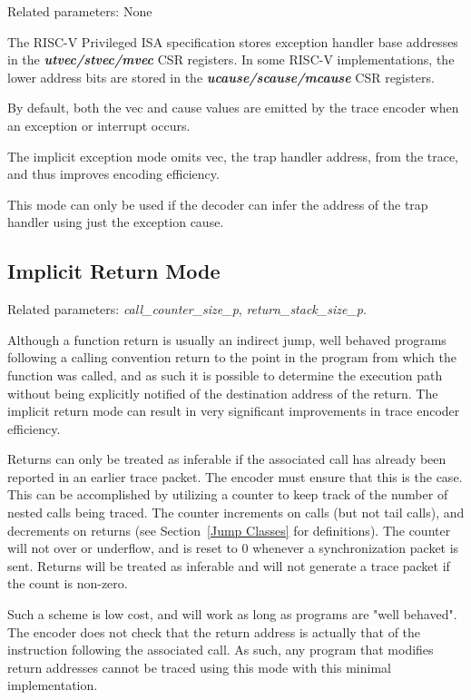 Related parameters: None

The RISC-V Privileged ISA specification stores exception handler base
addresses in the \textbf{\textit{utvec/stvec/mvec}} CSR registers.
In some RISC-V implementations, the lower address bits are stored in
the \textbf{\textit{ucause/scause/mcause}} CSR registers.

By default, both the vec and cause values are emitted by the trace encoder
when an exception or interrupt occurs.

The implicit exception mode omits vec, the trap handler address, from
the trace, and thus improves encoding efficiency.

This mode can only be used if the decoder can infer the address of the trap
handler using just the exception cause.

\subsection{Implicit Return Mode} \label{sec:implicit-return}

Related parameters: \textit{call\_counter\_size\_p}, \textit{return\_stack\_size\_p}.

Although a function return is usually an indirect jump, well behaved programs following a 
calling convention return to the point in the program from which the function was called, 
and as such it is possible to determine the execution path without being explicitly notified 
of the destination address of the return.  The implicit return mode can result in very
significant improvements in trace encoder efficiency.  

Returns can only be treated as inferable if the associated call has already been reported in 
an earlier trace packet. The encoder must ensure that this is the case.  This can be accomplished
by utilizing a counter to keep track of the number of nested calls being traced.  The counter 
increments on calls (but not tail calls), and decrements on returns (see Section~\ref{Jump Classes} 
for definitions).  The counter will not over or underflow, and is reset to 0 whenever a synchronization
packet is sent.  Returns will be treated as inferable and will not generate a trace
packet if the count is non-zero.

Such a scheme is low cost, and will work as long as programs are "well behaved". The encoder does not check that the
return address is actually that of the instruction following the associated call.  As such, any program that
modifies return addresses cannot be traced using this mode with this minimal implementation.

